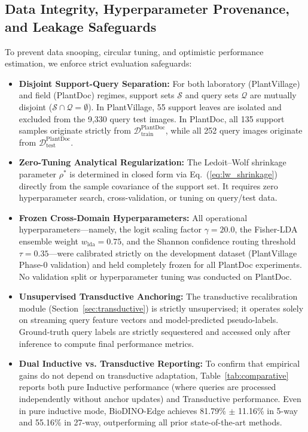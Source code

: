 \documentclass[a4paper,fleqn,nologo]{cas-dc}
\begin{document}
\subsection{Data Integrity, Hyperparameter Provenance, and Leakage Safeguards}
\label{sec:integrity}
To prevent data snooping, circular tuning, and optimistic performance estimation, we enforce strict evaluation safeguards:
\begin{itemize}
    \item \textbf{Disjoint Support-Query Separation:} For both laboratory (PlantVillage) and field (PlantDoc) regimes, support sets $\mathcal{S}$ and query sets $\mathcal{Q}$ are mutually disjoint ($\mathcal{S} \cap \mathcal{Q} = \emptyset$). In PlantVillage, 55 support leaves are isolated and excluded from the 9,330 query test images. In PlantDoc, all 135 support samples originate strictly from $\mathcal{D}_{\text{train}}^{\text{PlantDoc}}$, while all 252 query images originate from $\mathcal{D}_{\text{test}}^{\text{PlantDoc}}$.
    \item \textbf{Zero-Tuning Analytical Regularization:} The Ledoit--Wolf shrinkage parameter $\rho^*$ is determined in closed form via Eq.~(\ref{eq:lw_shrinkage}) directly from the sample covariance of the support set. It requires zero hyperparameter search, cross-validation, or tuning on query/test data.
    \item \textbf{Frozen Cross-Domain Hyperparameters:} All operational hyperparameters---namely, the logit scaling factor $\gamma = 20.0$, the Fisher-LDA ensemble weight $w_{\text{lda}} = 0.75$, and the Shannon confidence routing threshold $\tau = 0.35$---were calibrated strictly on the development dataset (PlantVillage Phase-0 validation) and held completely frozen for all PlantDoc experiments. No validation split or hyperparameter tuning was conducted on PlantDoc.
    \item \textbf{Unsupervised Transductive Anchoring:} The transductive recalibration module (Section~\ref{sec:transductive}) is strictly unsupervised; it operates solely on streaming query feature vectors and model-predicted pseudo-labels. Ground-truth query labels are strictly sequestered and accessed only after inference to compute final performance metrics.
    \item \textbf{Dual Inductive vs. Transductive Reporting:} To confirm that empirical gains do not depend on transductive adaptation, Table~\ref{tab:comparative} reports both pure Inductive performance (where queries are processed independently without anchor updates) and Transductive performance. Even in pure inductive mode, BioDINO-Edge achieves 81.79\% $\pm$ 11.16\% in 5-way and 55.16\% in 27-way, outperforming all prior state-of-the-art methods.
\end{itemize}
\end{document}
